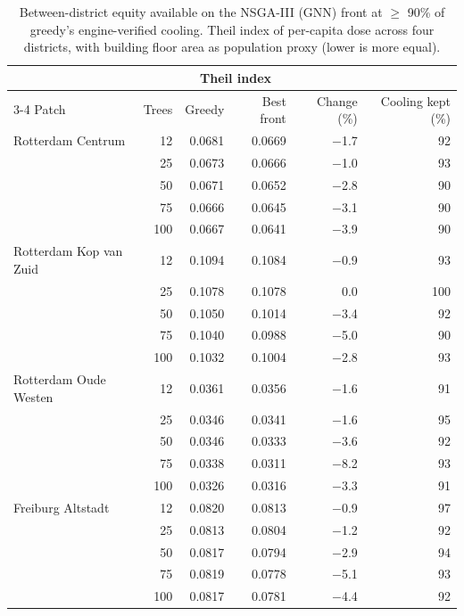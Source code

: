 \begin{table}[tbp]
\centering
\small
\caption{Between-district equity available on the NSGA-III (GNN) front at $\ge$ 90\% of greedy's engine-verified cooling. Theil index of per-capita dose across four districts, with building floor area as population proxy (lower is more equal).}
\label{tab:T5_equity}
\begin{tabular}{lrrrrr}
\toprule
 & & \multicolumn{2}{c}{Theil index} & & \\
\cmidrule(lr){3-4}
Patch & Trees & Greedy & Best front & Change (\%) & Cooling kept (\%) \\
\midrule
Rotterdam Centrum & 12 & 0.0681 & 0.0669 & $-$1.7 & 92 \\
 & 25 & 0.0673 & 0.0666 & $-$1.0 & 93 \\
 & 50 & 0.0671 & 0.0652 & $-$2.8 & 90 \\
 & 75 & 0.0666 & 0.0645 & $-$3.1 & 90 \\
 & 100 & 0.0667 & 0.0641 & $-$3.9 & 90 \\
\addlinespace
Rotterdam Kop van Zuid & 12 & 0.1094 & 0.1084 & $-$0.9 & 93 \\
 & 25 & 0.1078 & 0.1078 & 0.0 & 100 \\
 & 50 & 0.1050 & 0.1014 & $-$3.4 & 92 \\
 & 75 & 0.1040 & 0.0988 & $-$5.0 & 90 \\
 & 100 & 0.1032 & 0.1004 & $-$2.8 & 93 \\
\addlinespace
Rotterdam Oude Westen & 12 & 0.0361 & 0.0356 & $-$1.6 & 91 \\
 & 25 & 0.0346 & 0.0341 & $-$1.6 & 95 \\
 & 50 & 0.0346 & 0.0333 & $-$3.6 & 92 \\
 & 75 & 0.0338 & 0.0311 & $-$8.2 & 93 \\
 & 100 & 0.0326 & 0.0316 & $-$3.3 & 91 \\
\addlinespace
Freiburg Altstadt & 12 & 0.0820 & 0.0813 & $-$0.9 & 97 \\
 & 25 & 0.0813 & 0.0804 & $-$1.2 & 92 \\
 & 50 & 0.0817 & 0.0794 & $-$2.9 & 94 \\
 & 75 & 0.0819 & 0.0778 & $-$5.1 & 93 \\
 & 100 & 0.0817 & 0.0781 & $-$4.4 & 92 \\
\bottomrule
\end{tabular}
\end{table}
